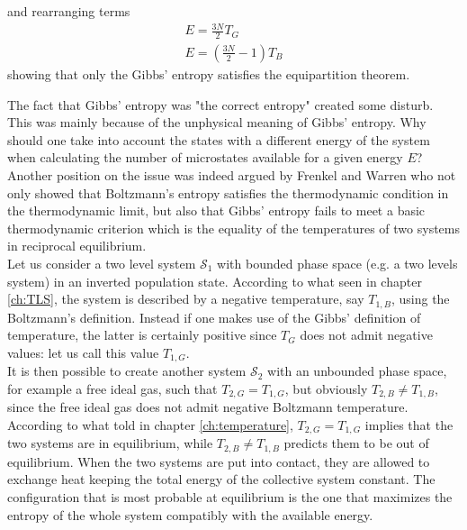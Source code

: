 and rearranging terms 
\begin{equation}\begin{gathered}
    E=\frac{3 N}{2} T_{G} \\
    E=\left(\frac{3 N}{2}-1\right) T_{B}
\end{gathered}
\label{eq:equipartition_results}
\end{equation}
showing that only the Gibbs' entropy satisfies the equipartition theorem. \par
\vspace{10pt}
The fact that Gibbs' entropy was "the correct entropy" created some disturb. This was mainly because of the unphysical meaning of Gibbs' entropy. Why should one 
take into account the states with a different energy of the system when calculating the number of microstates available for a given energy $E$? \\
Another position on the issue was indeed argued by Frenkel and Warren \cite{Frenkel} who not only showed that Boltzmann's entropy satisfies the thermodynamic condition in the thermodynamic limit, but also that Gibbs' entropy fails to meet a basic thermodynamic criterion which is 
the equality of the temperatures of two systems in reciprocal equilibrium. \\
Let us consider a two level system $\mathcal{S}_1$ with bounded phase space (e.g. a two levels system) in an inverted population state. According to what seen in chapter \ref{ch:TLS}, the system is described by a negative temperature, say $T_{1,B}$, using the Boltzmann's definition. Instead if one makes use of the Gibbs' definition of temperature, the latter is certainly positive since $T_G$ does not admit negative values: let us call this value $T_{1,G}$. \\
It is then possible to create another system $\mathcal{S}_2$ with an unbounded phase space, for example a free ideal gas, such that $T_{2,G} = T_{1,G}$, but obviously $T_{2,B} \neq T_{1,B}$, since the free ideal gas does not admit negative Boltzmann temperature. According to what told in chapter \ref{ch:temperature}, $T_{2,G} = T_{1,G}$ implies that the two systems are in equilibrium, while $T_{2,B} \neq T_{1,B}$ predicts them to be out of equilibrium. 
When the two systems are put into contact, they are allowed to exchange heat keeping the total energy of the collective system constant. The configuration that is most probable at equilibrium is the one that maximizes the entropy of the whole system compatibly with the available energy. \\
